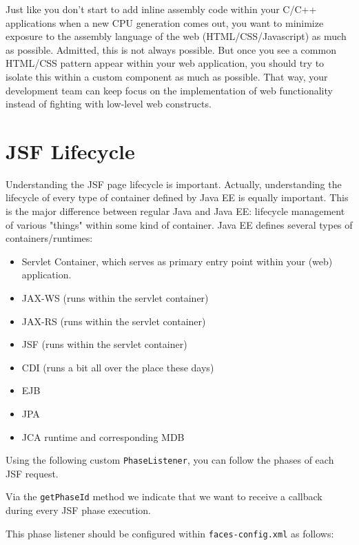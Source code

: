 Just like you don't start to add inline assembly code within your C/C++ applications when a new CPU generation comes out,
you want to minimize exposure to the assembly language of the web (HTML/CSS/Javascript) as much as possible.
Admitted, this is not always possible.
But once you see a common HTML/CSS pattern appear within your web application,
you should try to isolate this within a custom component as much as possible.
That way, your development team can keep focus on the implementation of web functionality instead of fighting with low-level web constructs.

\section{JSF Lifecycle}
Understanding the JSF page lifecycle is important.
Actually, understanding the lifecycle of every type of container defined by Java EE is equally important.
This is the major difference between regular Java and Java EE: lifecycle management of various "things" within some kind of container.
Java EE defines several types of containers/runtimes:
\begin{itemize}
	\item Servlet Container, which serves as primary entry point within your (web) application.
	\item JAX-WS (runs within the servlet container)
	\item JAX-RS (runs within the servlet container)
	\item JSF (runs within the servlet container)
	\item CDI (runs a bit all over the place these days)
	\item EJB
	\item JPA
	\item JCA runtime and corresponding MDB
\end{itemize}

Using the following custom \texttt{PhaseListener}, you can follow the phases of each JSF request.

Via the \texttt{getPhaseId} method we indicate that we want to receive a callback during every JSF phase execution.

This phase listener should be configured within \texttt{faces-config.xml} as follows:


